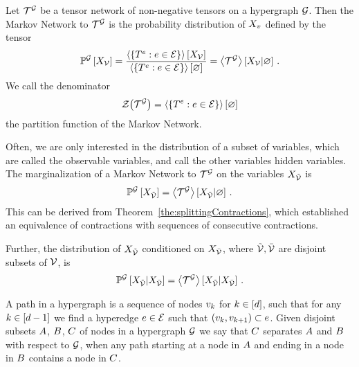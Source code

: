 \begin{definition}\label{def:markovNetwork}
	Let $\mathcal{T}^{\mathcal{G}}$ be a tensor network of non-negative tensors on a hypergraph $\mathcal{G}$.
	Then the Markov Network to $\mathcal{T}^{\mathcal{G}}$ is the probability distribution of $X_{v}$ defined by the tensor
		\[ \mathbb{P}^{\mathcal{G}}\left[X_{\mathcal{V}}\right] = \frac{
			\left\langle \{T^{e} : e \in \mathcal{E}\}\right\rangle \left[ X_{\mathcal{V}} \right] 
		}{
			\left\langle \{T^{e} : e \in \mathcal{E}\}\right\rangle \left[ \varnothing \right]
		} = \left\langle \mathcal{T}^{\mathcal{G}}\right\rangle \left[ X_{\mathcal{V}} | \varnothing \right] \, . \] 
	We call the denominator
		\[\mathcal{Z}{\left(\mathcal{T}^{\mathcal{G}}\right)} = \left\langle \{T^{e} : e \in \mathcal{E}\}\right\rangle \left[ \varnothing \right] \]
	the partition function of the Markov Network.
\end{definition}

Often, we are only interested in the distribution of a subset of variables, which are called the observable variables, and call the other variables hidden variables.
The marginalization of a Markov Network to $\mathcal{T}^{\mathcal{G}}$ on the variables $X_{\tilde{\mathcal{V}}}$ is
	\[
		\mathbb{P}^{\mathcal{G}}\left[X_{\tilde{\mathcal{V}}}\right]
		= \left\langle \mathcal{T}^{\mathcal{G}}\right\rangle \left[ X_{\tilde{\mathcal{V}}} | \varnothing \right] \, . 
	\]
This can be derived from Theorem~\ref{the:splittingContractions}, which established an equivalence of contractions with sequences of consecutive contractions.


Further, the distribution of $X_{\tilde{\mathcal{V}}}$ conditioned on $X_{\bar{\mathcal{V}}}$, where $\tilde{\mathcal{V}},\bar{\mathcal{V}}$ are disjoint subsets of $\mathcal{V}$, is
	\[
		\mathbb{P}^{\mathcal{G}}\left[ X_{\tilde{\mathcal{V}}} | X_{\bar{\mathcal{V}}}\right] 
		= \left\langle \mathcal{T}^{\mathcal{G}}\right\rangle \left[ X_{\tilde{\mathcal{V}}} | X_{\bar{\mathcal{V}}} \right] \, . 
	\]

\begin{definition}
	A path in a hypergraph is a sequence of nodes $v_{k}$ for $k\in[d]$, such that for any $k\in[d-1]$ we find a hyperedge $e\in\mathcal{E}$ such that $(v_{k}, v_{k+1})\subset e$.
	Given disjoint subsets $A$, $B$, $C$ of nodes in a hypergraph $\mathcal{G}$ we say that $C$ separates $A$ and $B$ with respect to $\mathcal{G}$, when any path starting at a node in $A$ and ending in a node in $B$ contains a node in $C$.
\end{definition}

